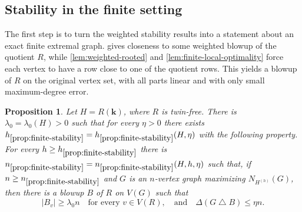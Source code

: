 \documentclass[10pt]{article}
\theoremstyle{plain}
\newtheorem{proposition}[proposition]{Proposition}
\theoremstyle{remark}
\newcommand{\symdiff}{\mathbin{\triangle}}
\begin{document}
\subsection{Stability in the finite setting}
\label{sec:finite-stability}

The first step is to turn the weighted stability results into a statement about an exact finite extremal graph.  gives closeness to some weighted blowup of the quotient $R$, while \cref{lem:weighted-rooted} and \cref{lem:finite-local-optimality} force each vertex to have a row close to one of the quotient rows. This yields a blowup of $R$ on the original vertex set, with all parts linear and with only small maximum-degree error.

\begin{proposition}
\label{prop:finite-stability}
Let $H=R(\mathbf k)$, where $R$ is twin-free. There is $\lambda_0=\lambda_0(H)>0$ such that for every $\eta>0$ there exists $h_{\ref{prop:finite-stability}}=h_{\ref{prop:finite-stability}}(H,\eta)$ with the following property. For every $h\ge h_{\ref{prop:finite-stability}}$ there is $n_{\ref{prop:finite-stability}}=n_{\ref{prop:finite-stability}}(H,h,\eta)$ such that, if $n\ge n_{\ref{prop:finite-stability}}$ and $G$ is an $n$-vertex graph maximizing $N_{H^{(h)}}(G)$, then there is a blowup $B$ of $R$ on $V(G)$ such that
\[
        |B_v|\ge\lambda_0 n\quad\text{for every }v\in V(R),
        \quad\text{and}\quad
        \Delta(G\symdiff B)\le\eta n.
\]
\end{proposition}
\end{document}
